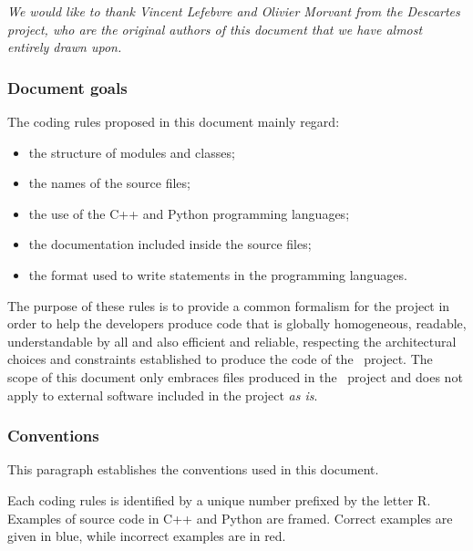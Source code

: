 
\emph{We would like to thank Vincent Lefebvre and Olivier Morvant from the Descartes project, who are the original authors of this document that we have almost entirely drawn upon.}

\subsubsection{Document goals}
The coding rules proposed in this document mainly regard:
\begin{itemize}
\item the structure of modules and classes;
\item the names of the source files;
\item the use of the C++ and Python programming languages;
\item the documentation included inside the source files;
\item the format used to write statements in the programming languages.
\end{itemize}

The purpose of these rules is to provide a common formalism for the project in order to help the developers produce code that is globally homogeneous, readable, understandable by all and also efficient and reliable, respecting the architectural choices and constraints established to produce the code of the \OT\ project. The scope of this document only embraces files produced in the \OT\ project and does not apply to external software included in the project \emph{as is}.

\subsubsection{Conventions}
This paragraph establishes the conventions used in this document.

Each coding rules is identified by a unique number prefixed by the letter R.
Examples of source code in C++ and Python are framed. Correct examples are given in blue, while incorrect examples are in red.

